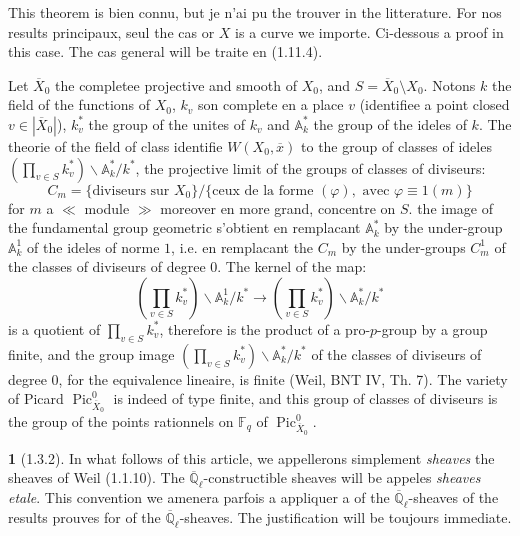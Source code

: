 \documentclass[12pt,a4paper]{article}
\theoremstyle{plain}
\theoremstyle{definition}
\theoremstyle{definition}
\newtheorem{para}{}[section]
\theoremstyle{remark}
\DeclareMathOperator{\Pic}{Pic}
\begin{document}
This theorem is bien connu, but je n'ai pu the trouver in the litterature. For nos results principaux, seul the cas or $X$ is a curve we importe. Ci-dessous a proof in this case. The cas general will be traite en (1.11.4).

Let $\overline{X}_0$ the completee projective and smooth of $X_0$, and $S = \overline{X}_0 \setminus X_0$. Notons $k$ the field of the functions of $X_0$, $k_v$ son complete en a place $v$ (identifiee a point closed $v \in |\overline{X}_0|$), $k_v^*$ the group of the unites of $k_v$ and $\mathbb{A}_k^*$ the group of the ideles of $k$. The theorie of the field of class identifie $W(X_0, \overline{x})$ to the group of classes of ideles $(\prod_{v \in S} k_v^*) \backslash \mathbb{A}_k^* / k^*$, the projective limit of the groups of classes of diviseurs:
\[C_m = \{\text{diviseurs sur } X_0\} / \{\text{ceux de la forme } (\varphi), \text{ avec } \varphi \equiv 1 (m)\}\]
for $m$ a $\ll$ module $\gg$ moreover en more grand, concentre on $S$. the image of the fundamental group geometric s'obtient en remplacant $\mathbb{A}_k^*$ by the under-group $\mathbb{A}_k^1$ of the ideles of norme $1$, i.e. en remplacant the $C_m$ by the under-groups $C_m^1$ of the classes of diviseurs of degree $0$. The kernel of the map:
\[(\prod_{v \in S} k_v^*) \backslash \mathbb{A}_k^1 / k^* \to (\prod_{v \in S} k_v^*) \backslash \mathbb{A}_k^* / k^*\]
is a quotient of $\prod_{v \in S} k_v^*$, therefore is the product of a pro-$p$-group by a group finite, and the group image $(\prod_{v \in S} k_v^*) \backslash \mathbb{A}_k^* / k^*$ of the classes of diviseurs of degree $0$, for the equivalence lineaire, is finite (Weil, BNT IV, Th. 7). The variety of Picard $\Pic^0_{\overline{X}_0}$ is indeed of type finite, and this group of classes of diviseurs is the group of the points rationnels on $\mathbb{F}_q$ of $\Pic^0_{\overline{X}_0}$.

\begin{para}[1.3.2]
In what follows of this article, we appellerons simplement \emph{sheaves} the sheaves of Weil (1.1.10). The $\overline{\mathbb{Q}}_\ell$-constructible sheaves will be appeles \emph{sheaves etale}. This convention we amenera parfois a appliquer a of the $\overline{\mathbb{Q}}_\ell$-sheaves of the results prouves for of the $\overline{\mathbb{Q}}_\ell$-sheaves. The justification will be toujours immediate.
\end{para}
\end{document}
